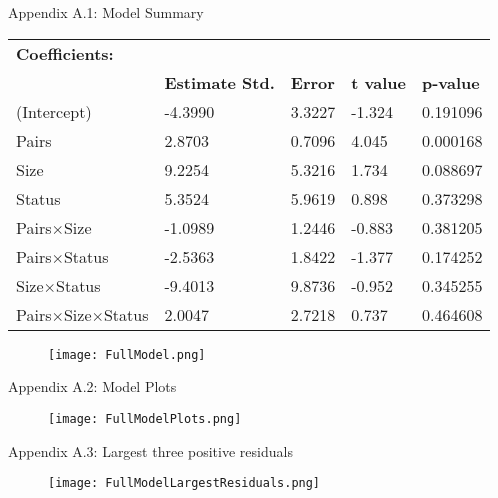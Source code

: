 \documentclass[a4paper, 12pt]{article}
\begin{document}
\begin{spacing}{1.5}
Appendix A.1: Model Summary
\begin{table}[h]
\begin{tabular}{lllll}
\hline
\textbf{Coefficients:}          & \textbf{}              & \textbf{}      & \textbf{}        & \textbf{}           \\
\textbf{}                       & \textbf{Estimate Std.} & \textbf{Error} & \textbf{t value} & \textbf{p-value} \\ \hline
(Intercept)                     & -4.3990                & 3.3227         & -1.324           & 0.191096            \\
Pairs                           & 2.8703                 & 0.7096         & 4.045            & 0.000168            \\
Size                            & 9.2254                 & 5.3216         & 1.734            & 0.088697            \\
Status                          & 5.3524                 & 5.9619         & 0.898            & 0.373298            \\
Pairs$\times$Size               & -1.0989                & 1.2446         & -0.883           & 0.381205            \\
Pairs$\times$Status             & -2.5363                & 1.8422         & -1.377           & 0.174252            \\
Size$\times$Status              & -9.4013                & 9.8736         & -0.952           & 0.345255            \\
Pairs$\times$Size$\times$Status & 2.0047                 & 2.7218         & 0.737            & 0.464608            \\ \hline
\end{tabular}
\end{table}

\begin{figure}[h]
    \texttt{[image: FullModel.png]}
\end{figure}

\newpage
Appendix A.2: Model Plots

\begin{figure}[h]
    \texttt{[image: FullModelPlots.png]}
\end{figure}

Appendix A.3: Largest three positive residuals

\begin{figure}[h]
    \texttt{[image: FullModelLargestResiduals.png]}
\end{figure}


\end{spacing}
\end{document}
